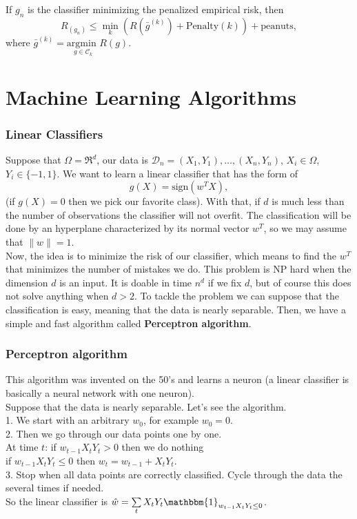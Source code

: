 \documentclass[11pt, english]{article}
\newcommand{\su}[2]{\sum\limits_{#1}^{#2}}
\begin{document}
If $g_n$ is the classifier minimizing the penalized empirical risk, then
\begin{equation}
	R_(g_n)\leq \underset{k}{\min}(R(\bar{g}^{(k)})+\text{Penalty}(k))+\text{peanuts},
\end{equation} 
where $\bar{g}^{(k)}=\underset{g\in\mathcal{C}_k}{\text{argmin }}R(g)$.

\section{Machine Learning Algorithms}

\subsubsection{Linear Classifiers}

Suppose that $\Omega= \Re^d$, our data is $\mathcal{D}_n=(X_1,Y_1),\dots,(X_n,Y_n)$, $X_i\in \Omega$, $Y_i\in\{-1,1\}$. We want to learn a linear classifier that has the form of 
\begin{equation}
	g(X)=\text{sign}(w^TX),
\end{equation}
(if $g(X)=0$ then we pick our favorite class). With that, if $d$ is much less than the number of observations the classifier will not overfit. The classification will be done by an hyperplane characterized by its normal vector $w^T$, so we may assume that $\|w\|=1$.\\

Now, the idea is to minimize the risk of our classifier, which means to find the $w^T$ that minimizes the number of mistakes we do. This problem is NP hard when the dimension $d$ is an input. It is doable in time $n^d$ if we fix $d$, but of course this does not solve anything when $d>2$. To tackle the problem we can suppose that the classification is easy, meaning that the data is nearly separable. Then, we have a simple and fast algorithm called \textbf{Perceptron algorithm}.

\subsubsection{Perceptron algorithm}
This algorithm was invented on the 50's and learns a neuron (a linear classifier is basically a neural network with one neuron). \\
Suppose that the data is nearly separable. Let's see the algorithm.\\

1. We start with an arbitrary $w_0$, for example $w_0=0$.\\
2. Then we go through our data points one by one.\\
At time $t$:
\hspace{2cm} if $w_{t-1}X_tY_t> 0$ then we do nothing\\
\hspace{2cm} if $w_{t-1}X_tY_t\leq 0$ then $w_t=w_{t-1}+X_tY_t$.\\
3. Stop when all data points are correctly classified. Cycle through the data the several times if needed. \\
So the linear classifier is $\hat{w}=\su{t}{}X_tY_t\mathbbm{1}_{w_{t-1}X_tY_t\leq 0}$.\\
\end{document}
